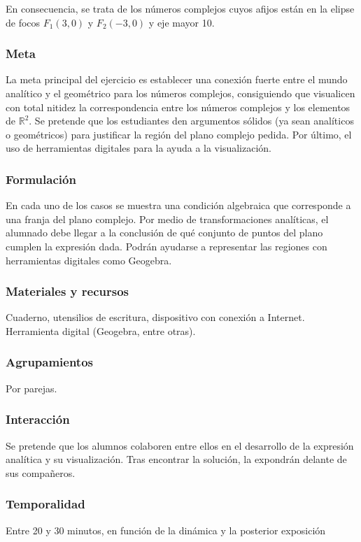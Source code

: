 \documentclass[../main.tex]{memoir}
\begin{document}
En consecuencia, se trata de los números complejos cuyos afijos están en la elipse de focos $F_1(3,0)$ y $F_2(-3,0)$ y eje mayor 10.


\subsubsection{Meta}
La meta principal del ejercicio es establecer una conexión fuerte entre el mundo analítico y el geométrico para los números complejos, consiguiendo que visualicen con total nitidez la correspondencia entre los números complejos y los elementos de $\mathbb{R}^2$. Se pretende que los estudiantes den argumentos sólidos (ya sean analíticos o geométricos) para justificar la región del plano complejo pedida. Por último, el uso de herramientas digitales para la ayuda a la visualización.

\subsubsection{Formulación}
En cada uno de los casos se muestra una condición algebraica que corresponde a una franja del plano complejo. Por medio de transformaciones analíticas, el alumnado debe llegar a la conclusión de qué conjunto de puntos del plano cumplen la expresión dada. Podrán ayudarse a representar las regiones con herramientas digitales como Geogebra.

\subsubsection{Materiales y recursos}
Cuaderno, utensilios de escritura, dispositivo con conexión a Internet. Herramienta digital (Geogebra, entre otras).


\subsubsection{Agrupamientos}
Por parejas.


\subsubsection{Interacción}
Se pretende que los alumnos colaboren entre ellos en el desarrollo de la expresión analítica y su visualización. Tras encontrar la solución, la expondrán delante de sus compañeros.


\subsubsection{Temporalidad}
Entre 20 y 30 minutos, en función de la dinámica y la posterior exposición
\end{document}
